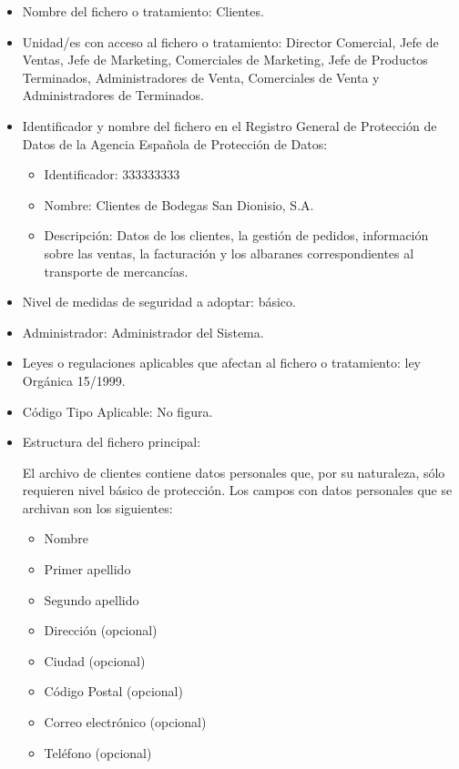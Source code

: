 \documentclass[a4paper,11pt,bibtotoc,noliststotoc]{scrbook}
\newcommand{\laorganizacion}{Bodegas San Dionisio, S.A.}
\begin{document}
\begin{itemize}
\item Nombre del fichero o tratamiento: Clientes.

\item Unidad/es con acceso al fichero o tratamiento: Director Comercial, Jefe de Ventas, Jefe de Marketing, Comerciales de Marketing, Jefe de Productos Terminados, Administradores de Venta, Comerciales de Venta y Administradores de Terminados.

\item Identificador y nombre del fichero en el Registro General de Protección de Datos de la Agencia Española de Protección de Datos:
	\begin{itemize}
	\item Identificador: 333333333
	\item Nombre: Clientes de \laorganizacion
	\item Descripción: Datos de los clientes, la gestión de pedidos, información sobre las ventas, la facturación y los albaranes correspondientes al transporte de mercancías.
	\end{itemize}

\item Nivel de medidas de seguridad a adoptar: básico.

\item Administrador: Administrador del Sistema.

\item Leyes o regulaciones aplicables que afectan al fichero o tratamiento: ley Orgánica 15/1999.

\item Código Tipo Aplicable: No figura.

\item Estructura del fichero principal: 

El archivo de clientes contiene datos personales que, por su naturaleza, sólo requieren nivel básico de protección. Los campos con datos personales que se archivan son los siguientes:
\begin{itemize}
\item Nombre
\item Primer apellido
\item Segundo apellido
\item Dirección (opcional)
\item Ciudad (opcional)
\item Código Postal (opcional)
\item Correo electrónico (opcional)
\item Teléfono (opcional)
\end{itemize}



\end{itemize}
\end{document}
